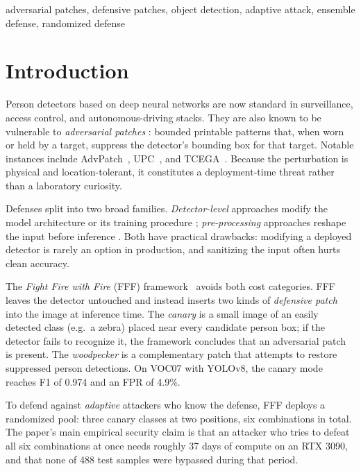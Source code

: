 \documentclass[conference]{IEEEtran}
\begin{document}
\begin{IEEEkeywords}
adversarial patches, defensive patches, object detection, adaptive attack,
ensemble defense, randomized defense
\end{IEEEkeywords}

\section{Introduction}
\label{sec:intro}

Person detectors based on deep neural networks are now standard in
surveillance, access control, and autonomous-driving stacks. They are also
known to be vulnerable to \emph{adversarial patches} \cite{brown2017adversarial}:
bounded printable patterns that, when worn or held by a target, suppress the
detector's bounding box for that target. Notable instances include
AdvPatch~\cite{thys2019fooling}, UPC~\cite{huang2020upc},
and TCEGA~\cite{hu2022tcega}. Because the perturbation is physical and
location-tolerant, it constitutes a deployment-time threat rather than a
laboratory curiosity.

Defenses split into two broad families. \emph{Detector-level} approaches
modify the model architecture or its training procedure
\cite{liu2022segment}; \emph{pre-processing} approaches reshape the input
before inference \cite{hayes2018visible}. Both have practical drawbacks:
modifying a deployed detector is rarely an option in production, and
sanitizing the input often hurts clean accuracy.

The \emph{Fight Fire with Fire} (FFF) framework~\cite{feng2025fff} avoids
both cost categories. FFF leaves the detector untouched and instead inserts
two kinds of \emph{defensive patch} into the image at inference time. The
\emph{canary} is a small image of an easily detected class (e.g.\ a zebra)
placed near every candidate person box; if the detector fails to recognize
it, the framework concludes that an adversarial patch is present. The
\emph{woodpecker} is a complementary patch that attempts to restore
suppressed person detections. On VOC07 with YOLOv8, the canary mode reaches
F1 of 0.974 and an FPR of 4.9\%.

To defend against \emph{adaptive} attackers who know the defense, FFF
deploys a randomized pool: three canary classes at two positions, six
combinations in total. The paper's main empirical security claim is that an
attacker who tries to defeat all six combinations at once needs roughly 37
days of compute on an RTX 3090, and that none of 488 test samples were
bypassed during that period.
\end{document}
